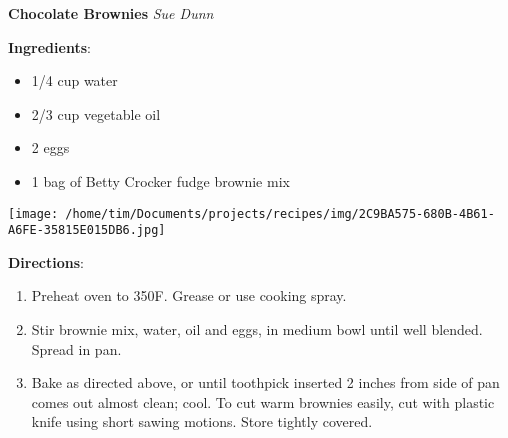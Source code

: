 \documentclass[11pt, twoside, openany]{book}
\begin{document}
\noindent\begin{minipage}[t]{\linewidth}%
{\Large\textbf{Chocolate Brownies}} \label{chocolate-brownies}\hfill\textit{Sue Dunn}\\
\noindent\begin{minipage}[t]{0.78\linewidth}%
\textbf{Ingredients}:\vspace{-3mm}
\begin{multicols}{2}
\begin{itemize}\setlength\itemsep{-1mm}
\item 1/4 cup water
\item 2/3 cup vegetable oil
\item 2 eggs
\item 1 bag of Betty Crocker fudge brownie mix
\end{itemize}
\end{multicols}
\end{minipage}
\noindent\begin{minipage}[t]{0.18\linewidth}
\centering \strut\vspace*{-\baselineskip}\newline
\texttt{[image: /home/tim/Documents/projects/recipes/img/2C9BA575-680B-4B61-A6FE-35815E015DB6.jpg]}\\
\end{minipage}\vspace{3mm}
\textbf{Directions}:
\vspace{-3mm}\begin{enumerate}\setlength\itemsep{-1mm}
\item Preheat oven to 350F. Grease or use cooking spray.
\item Stir brownie mix, water, oil and eggs, in medium bowl until well blended. Spread in pan.
\item Bake as directed above, or until toothpick inserted 2 inches from side of pan comes out almost clean; cool. To cut warm brownies easily, cut with plastic knife using short sawing motions. Store tightly covered.
\end{enumerate}
\end{minipage}\vspace{8mm}
\end{document}
